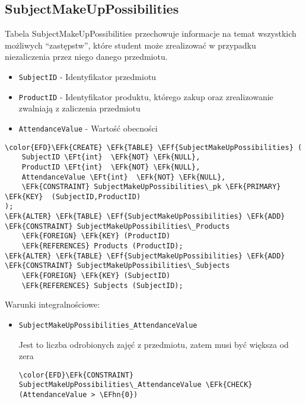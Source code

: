 \documentclass[11pt]{article}
\newcommand{\EFk}[1]{\textcolor{EFk}{\textbf{#1}}} %
\newcommand{\EFf}[1]{\textcolor{EFf}{#1}} %
\newcommand{\EFt}[1]{\textcolor{EFt}{\textbf{#1}}} %
\newcommand{\EFhn}[1]{\textcolor{EFhn}{#1}} %
\begin{document}
\subsection{SubjectMakeUpPossibilities}
\label{sec:org0cf0d12}
Tabela SubjectMakeUpPossibilities przechowuje informacje na temat wszystkich możliwych ``zastępstw'', które student może zrealizować w przypadku niezaliczenia przez niego danego przedmiotu.
\begin{itemize}
\item \texttt{SubjectID} - Identyfikator przedmiotu
\item \texttt{ProductID} - Identyfikator produktu, którego zakup oraz zrealizowanie zwalniają z zaliczenia przedmiotu
\item \texttt{AttendanceValue} - Wartość obecności
\end{itemize}
\begin{Code}
\begin{Verbatim}
\color{EFD}\EFk{CREATE} \EFk{TABLE} \EFf{SubjectMakeUpPossibilities} (
    SubjectID \EFt{int}  \EFk{NOT} \EFk{NULL},
    ProductID \EFt{int}  \EFk{NOT} \EFk{NULL},
    AttendanceValue \EFt{int}  \EFk{NOT} \EFk{NULL},
    \EFk{CONSTRAINT} SubjectMakeUpPossibilities\_pk \EFk{PRIMARY} \EFk{KEY}  (SubjectID,ProductID)
);
\EFk{ALTER} \EFk{TABLE} \EFf{SubjectMakeUpPossibilities} \EFk{ADD} \EFk{CONSTRAINT} SubjectMakeUpPossibilities\_Products
    \EFk{FOREIGN} \EFk{KEY} (ProductID)
    \EFk{REFERENCES} Products (ProductID);
\EFk{ALTER} \EFk{TABLE} \EFf{SubjectMakeUpPossibilities} \EFk{ADD} \EFk{CONSTRAINT} SubjectMakeUpPossibilities\_Subjects
    \EFk{FOREIGN} \EFk{KEY} (SubjectID)
    \EFk{REFERENCES} Subjects (SubjectID);
\end{Verbatim}
\end{Code}
Warunki integralnościowe:


\begin{itemize}
\item \texttt{SubjectMakeUpPossibilities\_AttendanceValue}

Jest to liczba odrobionych zajęć z przedmiotu, zatem musi być większa od zera
\begin{Code}
\begin{Verbatim}
\color{EFD}\EFk{CONSTRAINT} SubjectMakeUpPossibilities\_AttendanceValue \EFk{CHECK}
(AttendanceValue > \EFhn{0})
\end{Verbatim}
\end{Code}
\end{itemize}
\end{document}
